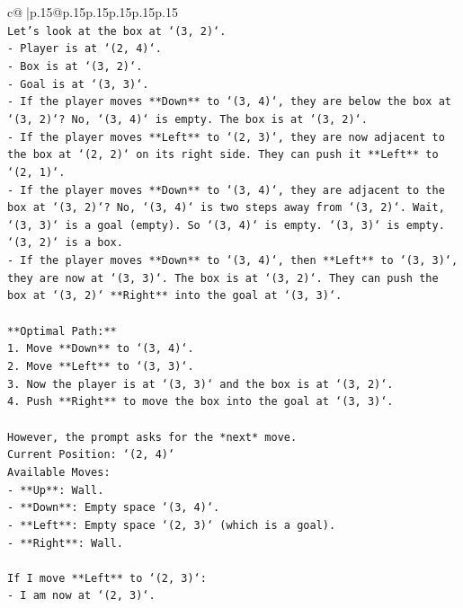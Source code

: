 \documentclass{article}
\begin{document}
{\begin{supertabular}{c@{$\;$}|p{.15\linewidth}@{}p{.15\linewidth}p{.15\linewidth}p{.15\linewidth}p{.15\linewidth}p{.15\linewidth}}
{{{\\ 
\texttt{Let's look at the box at `(3, 2)`.} \\
\texttt{{-} Player is at `(2, 4)`.} \\
\texttt{{-} Box is at `(3, 2)`.} \\
\texttt{{-} Goal is at `(3, 3)`.} \\
\texttt{{-} If the player moves **Down** to `(3, 4)`, they are below the box at `(3, 2)`? No, `(3, 4)` is empty. The box is at `(3, 2)`.} \\
\texttt{{-} If the player moves **Left** to `(2, 3)`, they are now adjacent to the box at `(2, 2)` on its right side. They can push it **Left** to `(2, 1)`.} \\
\texttt{{-} If the player moves **Down** to `(3, 4)`, they are adjacent to the box at `(3, 2)`? No, `(3, 4)` is two steps away from `(3, 2)`. Wait, `(3, 3)` is a goal (empty). So `(3, 4)` is empty. `(3, 3)` is empty. `(3, 2)` is a box.} \\
\texttt{{-} If the player moves **Down** to `(3, 4)`, then **Left** to `(3, 3)`, they are now at `(3, 3)`. The box is at `(3, 2)`. They can push the box at `(3, 2)` **Right** into the goal at `(3, 3)`.} \\
\\ 
\texttt{**Optimal Path:**} \\
\texttt{1.  Move **Down** to `(3, 4)`.} \\
\texttt{2.  Move **Left** to `(3, 3)`.} \\
\texttt{3.  Now the player is at `(3, 3)` and the box is at `(3, 2)`.} \\
\texttt{4.  Push **Right** to move the box into the goal at `(3, 3)`.} \\
\\ 
\texttt{However, the prompt asks for the *next* move.} \\
\texttt{Current Position: `(2, 4)`} \\
\texttt{Available Moves:} \\
\texttt{{-} **Up**: Wall.} \\
\texttt{{-} **Down**: Empty space `(3, 4)`.} \\
\texttt{{-} **Left**: Empty space `(2, 3)` (which is a goal).} \\
\texttt{{-} **Right**: Wall.} \\
\\ 
\texttt{If I move **Left** to `(2, 3)`:} \\
\texttt{{-} I am now at `(2, 3)`.} \\
}}}
\end{supertabular}}
\end{document}
